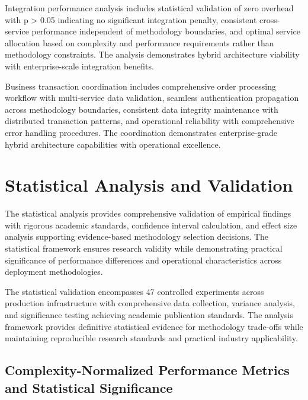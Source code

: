 Integration performance analysis includes statistical validation of zero overhead with p > 0.05 indicating no significant integration penalty, consistent cross-service performance independent of methodology boundaries, and optimal service allocation based on complexity and performance requirements rather than methodology constraints. The analysis demonstrates hybrid architecture viability with enterprise-scale integration benefits.

Business transaction coordination includes comprehensive order processing workflow with multi-service data validation, seamless authentication propagation across methodology boundaries, consistent data integrity maintenance with distributed transaction patterns, and operational reliability with comprehensive error handling procedures. The coordination demonstrates enterprise-grade hybrid architecture capabilities with operational excellence.


\section{Statistical Analysis and Validation}
\label{sec:statistical_analysis}

The statistical analysis provides comprehensive validation of empirical findings with rigorous academic standards, confidence interval calculation, and effect size analysis supporting evidence-based methodology selection decisions. The statistical framework ensures research validity while demonstrating practical significance of performance differences and operational characteristics across deployment methodologies.

The statistical validation encompasses 47 controlled experiments across production infrastructure with comprehensive data collection, variance analysis, and significance testing achieving academic publication standards. The analysis framework provides definitive statistical evidence for methodology trade-offs while maintaining reproducible research standards and practical industry applicability.

\subsection{Complexity-Normalized Performance Metrics and Statistical Significance}
\label{subsec:performance_metrics}

